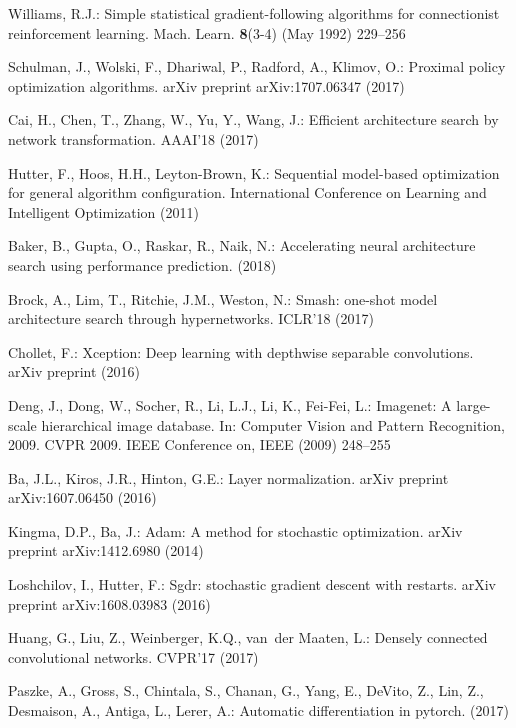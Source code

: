 \documentclass[runningheads]{llncs}
\begin{document}
\begin{thebibliography}{10}
Williams, R.J.:
\newblock Simple statistical gradient-following algorithms for connectionist
  reinforcement learning.
\newblock Mach. Learn. \textbf{8}(3-4) (May 1992)  229--256

Schulman, J., Wolski, F., Dhariwal, P., Radford, A., Klimov, O.:
\newblock Proximal policy optimization algorithms.
\newblock arXiv preprint arXiv:1707.06347 (2017)

Cai, H., Chen, T., Zhang, W., Yu, Y., Wang, J.:
\newblock Efficient architecture search by network transformation.
\newblock AAAI'18 (2017)

Hutter, F., Hoos, H.H., Leyton-Brown, K.:
\newblock Sequential model-based optimization for general algorithm
  configuration.
\newblock International Conference on Learning and Intelligent Optimization
  (2011)

Baker, B., Gupta, O., Raskar, R., Naik, N.:
\newblock Accelerating neural architecture search using performance prediction.
\newblock (2018)

Brock, A., Lim, T., Ritchie, J.M., Weston, N.:
\newblock Smash: one-shot model architecture search through hypernetworks.
\newblock ICLR'18 (2017)

Chollet, F.:
\newblock Xception: Deep learning with depthwise separable convolutions.
\newblock arXiv preprint (2016)

Deng, J., Dong, W., Socher, R., Li, L.J., Li, K., Fei-Fei, L.:
\newblock Imagenet: A large-scale hierarchical image database.
\newblock In: Computer Vision and Pattern Recognition, 2009. CVPR 2009. IEEE
  Conference on, IEEE (2009)  248--255

Ba, J.L., Kiros, J.R., Hinton, G.E.:
\newblock Layer normalization.
\newblock arXiv preprint arXiv:1607.06450 (2016)

Kingma, D.P., Ba, J.:
\newblock Adam: A method for stochastic optimization.
\newblock arXiv preprint arXiv:1412.6980 (2014)

Loshchilov, I., Hutter, F.:
\newblock Sgdr: stochastic gradient descent with restarts.
\newblock arXiv preprint arXiv:1608.03983 (2016)

Huang, G., Liu, Z., Weinberger, K.Q., van~der Maaten, L.:
\newblock Densely connected convolutional networks.
\newblock CVPR'17 (2017)

Paszke, A., Gross, S., Chintala, S., Chanan, G., Yang, E., DeVito, Z., Lin, Z.,
  Desmaison, A., Antiga, L., Lerer, A.:
\newblock Automatic differentiation in pytorch.
\newblock (2017)

\end{thebibliography}
\end{document}
